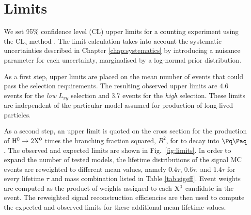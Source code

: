 \section{Limits}
\label{sec:limits}

We set 95\% confidence level
(CL) upper limits for a counting experiment
using the CL$_\mathrm{s}$ method \cite{Read:2002hq, Junk:1999kv}. The limit calculation
takes into account the systematic uncertainties described in Chapter 
\ref{chap:systematics} by introducing
a nuisance parameter for each uncertainty, marginalised by a log-normal prior distribution.

As a first step, upper limits are placed on the mean number of events that could pass
the selection requirements. The resulting observed upper limits are 4.6 events
for the {\it low} $L_{xy}$ selection and 3.7 events for the {\it high} selection.
 These limits are independent
of the particular model assumed for production of long-lived particles.

As a second step, an upper limit is quoted on the cross section
for the production of $\mathrm{H}^{0} \to 2\mathrm{X^{0}}$ times the branching fraction squared, $B^2$, for \X to decay into $\qq$.
The observed and
expected limits are shown in Fig.~\ref{fig:limits}. In order to expand the number of tested models,
the lifetime distributions of the signal MC events are reweighted to
different mean values, namely $0.4\tau$, $0.6\tau$, and $1.4\tau$ for every
lifetime $\tau$ and mass combination listed
in Table \ref{tab:sigeff}.
Event weights are computed as the product
 of weights assigned to each $\mathrm{X^{0}}$ candidate in the event.
The reweighted signal reconstruction efficiencies are then used
to compute the expected and observed limits for these additional mean lifetime values.

